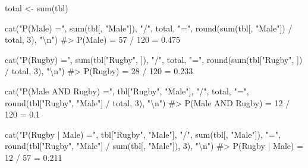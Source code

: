 \documentclass[
  11pt,
  a4paper,
  oneside,
  open=any]{scrbook}
\newenvironment{Shaded}{\begin{snugshade}}{\end{snugshade}}
\newcommand{\CommentTok}[1]{\textcolor[rgb]{0.37,0.37,0.37}{#1}}
\newcommand{\DecValTok}[1]{\textcolor[rgb]{0.68,0.00,0.00}{#1}}
\newcommand{\FunctionTok}[1]{\textcolor[rgb]{0.28,0.35,0.67}{#1}}
\newcommand{\NormalTok}[1]{\textcolor[rgb]{0.00,0.23,0.31}{#1}}
\newcommand{\OtherTok}[1]{\textcolor[rgb]{0.00,0.23,0.31}{#1}}
\newcommand{\SpecialCharTok}[1]{\textcolor[rgb]{0.37,0.37,0.37}{#1}}
\newcommand{\StringTok}[1]{\textcolor[rgb]{0.13,0.47,0.30}{#1}}
\begin{document}
\begin{Shaded}
\begin{Highlighting}[]
\NormalTok{total }\OtherTok{\textless{}{-}} \FunctionTok{sum}\NormalTok{(tbl)}

\FunctionTok{cat}\NormalTok{(}\StringTok{"P(Male) ="}\NormalTok{, }\FunctionTok{sum}\NormalTok{(tbl[, }\StringTok{"Male"}\NormalTok{]), }\StringTok{"/"}\NormalTok{, total, }\StringTok{"="}\NormalTok{,}
    \FunctionTok{round}\NormalTok{(}\FunctionTok{sum}\NormalTok{(tbl[, }\StringTok{"Male"}\NormalTok{]) }\SpecialCharTok{/}\NormalTok{ total, }\DecValTok{3}\NormalTok{), }\StringTok{"}\SpecialCharTok{\textbackslash{}n}\StringTok{"}\NormalTok{)}
\CommentTok{\#\textgreater{} P(Male) = 57 / 120 = 0.475}

\FunctionTok{cat}\NormalTok{(}\StringTok{"P(Rugby) ="}\NormalTok{, }\FunctionTok{sum}\NormalTok{(tbl[}\StringTok{"Rugby"}\NormalTok{, ]), }\StringTok{"/"}\NormalTok{, total, }\StringTok{"="}\NormalTok{,}
    \FunctionTok{round}\NormalTok{(}\FunctionTok{sum}\NormalTok{(tbl[}\StringTok{"Rugby"}\NormalTok{, ]) }\SpecialCharTok{/}\NormalTok{ total, }\DecValTok{3}\NormalTok{), }\StringTok{"}\SpecialCharTok{\textbackslash{}n}\StringTok{"}\NormalTok{)}
\CommentTok{\#\textgreater{} P(Rugby) = 28 / 120 = 0.233}

\FunctionTok{cat}\NormalTok{(}\StringTok{"P(Male AND Rugby) ="}\NormalTok{, tbl[}\StringTok{"Rugby"}\NormalTok{, }\StringTok{"Male"}\NormalTok{], }\StringTok{"/"}\NormalTok{, total, }\StringTok{"="}\NormalTok{,}
    \FunctionTok{round}\NormalTok{(tbl[}\StringTok{"Rugby"}\NormalTok{, }\StringTok{"Male"}\NormalTok{] }\SpecialCharTok{/}\NormalTok{ total, }\DecValTok{3}\NormalTok{), }\StringTok{"}\SpecialCharTok{\textbackslash{}n}\StringTok{"}\NormalTok{)}
\CommentTok{\#\textgreater{} P(Male AND Rugby) = 12 / 120 = 0.1}

\FunctionTok{cat}\NormalTok{(}\StringTok{"P(Rugby | Male) ="}\NormalTok{, tbl[}\StringTok{"Rugby"}\NormalTok{, }\StringTok{"Male"}\NormalTok{], }\StringTok{"/"}\NormalTok{,}
    \FunctionTok{sum}\NormalTok{(tbl[, }\StringTok{"Male"}\NormalTok{]), }\StringTok{"="}\NormalTok{,}
    \FunctionTok{round}\NormalTok{(tbl[}\StringTok{"Rugby"}\NormalTok{, }\StringTok{"Male"}\NormalTok{] }\SpecialCharTok{/} \FunctionTok{sum}\NormalTok{(tbl[, }\StringTok{"Male"}\NormalTok{]), }\DecValTok{3}\NormalTok{), }\StringTok{"}\SpecialCharTok{\textbackslash{}n}\StringTok{"}\NormalTok{)}
\CommentTok{\#\textgreater{} P(Rugby | Male) = 12 / 57 = 0.211}
\end{Highlighting}
\end{Shaded}
\end{document}

